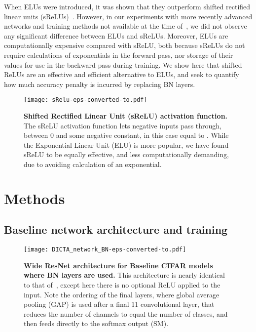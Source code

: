 \documentclass[conference]{IEEEtran}
\begin{document}
When ELUs were introduced, it was shown that they outperform shifted rectified linear units (sReLUs)~\cite{Clevert.15}. However, in our experiments with more recently advanced networks and training methods not available at the time of~\cite{Clevert.15}, we did not observe any significant difference between ELUs and sReLUs. Moreover, ELUs are computationally expensive compared with sReLU, both because sReLUs do not require calculations of exponentials in the forward pass, nor storage of their values for use in the backward pass during training. We show here that shifted ReLUs are an effective and efficient alternative to ELUs, and seek to quantify how much accuracy penalty is incurred by replacing BN layers.

\begin{figure}[h]
\begin{center}
{\texttt{[image: sRelu-eps-converted-to.pdf]}}
\end{center}
\caption{{\bf  Shifted Rectified Linear Unit (sReLU) activation function.} The sReLU activation function lets negative inputs pass through, between 0 and some negative constant, in this case equal to . While the Exponential Linear Unit (ELU) is more popular, we have found sReLU to be equally effective, and less computationally demanding, due to avoiding calculation of an exponential.}\label{fig:srelu}
\end{figure}





\section{Methods}\label{S3}

\subsection{Baseline network architecture and training}

\begin{figure*}[ht]
\begin{center}
{\texttt{[image: DICTA\_network\_BN-eps-converted-to.pdf]}}
\end{center}
\caption{{\bf  Wide ResNet architecture for Baseline CIFAR models where BN layers are used.} This architecture is nearly identical to that of~\cite{McDonnell.18}, except here there is no optional ReLU applied to the input. Note the ordering of the final layers, where global average pooling (GAP) is used after a final 11 convolutional layer, that reduces the number of channels to equal the number of classes, and then feeds directly to the softmax output (SM).}\label{fig:arch1}
\end{figure*}
\end{document}
